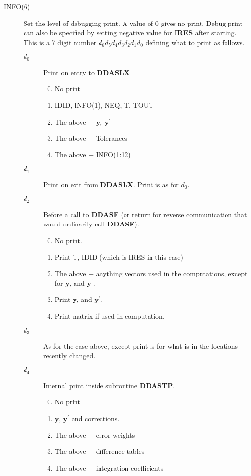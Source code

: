 \documentclass[twoside]{MATH77}
\begin{document}
\begin{description}
\item[INFO(6)] \label{info6} Set the level of debugging print.  A
  value of 0 gives no print.  Debug print can also be specified by
  setting negative value for \textbf{IRES} after starting.  This is a
  7 digit number $d_6d_5d_4d_3d_2d_1d_0$ defining what to print as
  follows.
  \begin{description}
  \item[$d_0$]Print on entry to \textbf{DDASLX}
    \begin{enumerate}\setcounter{enumi}{-1}
    \item No print
    \item IDID, INFO(1), NEQ, T, TOUT
    \item The above + $\mathbf{y},\ \mathbf{y}^{\prime}$
    \item The above + Tolerances
    \item The above + INFO(1:12)
    \end{enumerate}
  \item[$d_1$] Print on exit from \textbf{DDASLX}. Print is as for $d_0$.
  \item[$d_2$] Before a call to \textbf{DDASF} (or return for reverse communication
    that would ordinarily call \textbf{DDASF}).
    \begin{enumerate}\setcounter{enumi}{-1}
    \item  No print.
    \item  Print T, IDID (which is IRES in this case)
    \item  The above + anything vectors used in the computations,
      except for $\mathbf{y}$, and $\mathbf{y^\prime}$.
    \item  Print $\mathbf{y}$, and $\mathbf{y^\prime}$.
    \item  Print matrix if used in computation.
    \end{enumerate}
  \item[$d_3$] As for the case above, except print is for what is in the
    locations recently changed.
  \item[$d_4$] Internal print inside subroutine \textbf{DDASTP}.
    \begin{enumerate}\setcounter{enumi}{-1}
    \item No print
    \item $\mathbf{y}$, $\mathbf{y}^{\prime}$ and corrections.
    \item The above + error weights
    \item The above + difference tables
    \item The above + integration coefficients

\end{enumerate}
\end{description}
\end{description}
\end{document}
